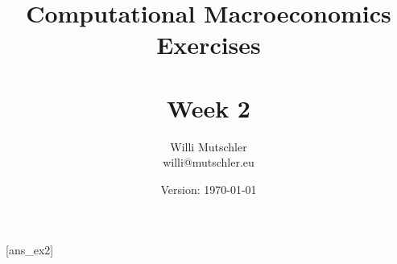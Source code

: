 
\newif\ifDisplaySolutions %


\title{Computational Macroeconomics\\Exercises\\~\\Week 2}
\author{Willi Mutschler\\willi@mutschler.eu}
\date{Version: \today}
\maketitle\thispagestyle{empty}

\newpage
{}[ans_ex2]
\tableofcontents\thispagestyle{empty}\newpage

\setcounter{page}{1}
\newpage
\newpage
\newpage
\newpage


\printbibliography
{}
\ifDisplaySolutions
\newpage
\appendix
\section{Solutions}

\fi

